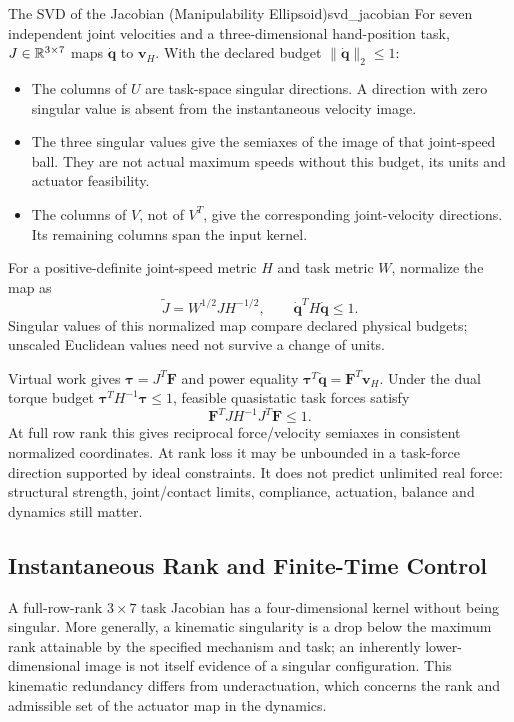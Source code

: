 \begin{example}{The SVD of the Jacobian (Manipulability Ellipsoid)}{svd_jacobian}
For seven independent joint velocities and a three-dimensional hand-position task, $J\in\mathbb{R}^{3\times7}$ maps $\dot{\mathbf q}$ to $\mathbf v_H$. With the declared budget $\|\dot{\mathbf q}\|_2\le1$:
\begin{itemize}
    \item The columns of $U$ are task-space singular directions. A direction with zero singular value is absent from the instantaneous velocity image.
    \item The three singular values give the semiaxes of the image of that joint-speed ball. They are not actual maximum speeds without this budget, its units and actuator feasibility.
    \item The columns of $V$, not of $V^T$, give the corresponding joint-velocity directions. Its remaining columns span the input kernel.
\end{itemize}

For a positive-definite joint-speed metric $H$ and task metric $W$, normalize the map as
\[
\widetilde J=W^{1/2}JH^{-1/2},
\qquad \dot{\mathbf q}^TH\dot{\mathbf q}\le1.
\]
Singular values of this normalized map compare declared physical budgets; unscaled Euclidean values need not survive a change of units.

Virtual work gives $\boldsymbol\tau=J^T\mathbf F$ and power equality $\boldsymbol\tau^T\dot{\mathbf q}=\mathbf F^T\mathbf v_H$. Under the dual torque budget $\boldsymbol\tau^TH^{-1}\boldsymbol\tau\le1$, feasible quasistatic task forces satisfy
\[
\mathbf F^TJH^{-1}J^T\mathbf F\le1.
\]
At full row rank this gives reciprocal force/velocity semiaxes in consistent normalized coordinates. At rank loss it may be unbounded in a task-force direction supported by ideal constraints. It does not predict unlimited real force: structural strength, joint/contact limits, compliance, actuation, balance and dynamics still matter.
\end{example}

\subsection{Instantaneous Rank and Finite-Time Control}

A full-row-rank $3\times7$ task Jacobian has a four-dimensional kernel without being singular. More generally, a kinematic singularity is a drop below the maximum rank attainable by the specified mechanism and task; an inherently lower-dimensional image is not itself evidence of a singular configuration. This kinematic redundancy differs from underactuation, which concerns the rank and admissible set of the actuator map in the dynamics.


